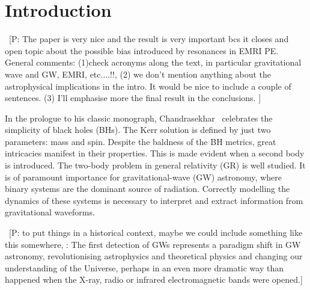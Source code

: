 \documentclass[aps,prd,amsfonts,amssymb,amsmath,nofootinbib,showpacs,superscriptaddress,twocolumn,floatfix]{revtex4-1}
\newcommand{\pcm}[1]{{\color{blue}~\textsf{[P: #1]}}}
\begin{document}

\maketitle

\section{Introduction}
\pcm{The paper is very nice and the result is very important bcs it closes and open topic about the possible bias introduced by resonances in EMRI PE. General comments: (1)check acronyms along the text, in particular gravitational wave and GW, EMRI, etc....!!, (2) we don't mention anything about the astrophysical implications in the intro. It would be nice to include a couple of sentences. (3) I'll emphasise more the final result in the conclusions. }
 
In the prologue to his classic monograph, Chandrasekhar~\cite{Chandrasekhar1992} celebrates the simplicity of black holes (BHs). The Kerr solution is defined by just two parameters: mass and spin. Despite the baldness of the BH metrics, great intricacies manifest in their properties. This is made evident when a second body is introduced. The two-body problem in general relativity (GR) is well studied. It is of paramount importance for gravitational-wave (GW) astronomy, where binary systems are the dominant source of radiation. Correctly modelling the dynamics of these systems is necessary to interpret and extract information from gravitational waveforms.

\pcm{to put things in a historical context, maybe we could include something like this somewhere, : The first detection of GWs represents a paradigm shift in GW astronomy, revolutionising astrophysics and theoretical physics  and changing our understanding of the Universe, perhaps in an even more dramatic way than happened when the X-ray, radio or infrared electromagnetic bands were opened.}
\end{document}
